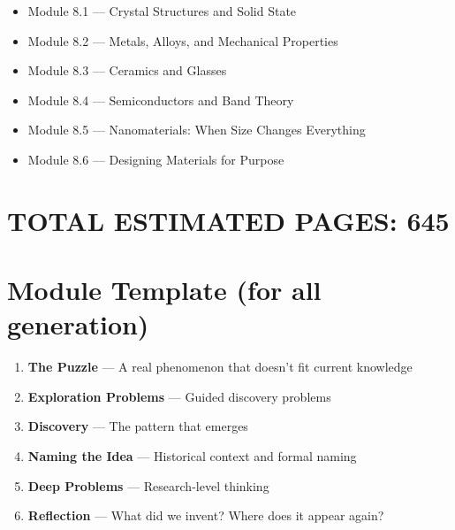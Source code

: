 \documentclass{article}
\begin{document}
\begin{itemize}
    \item Module 8.1 — Crystal Structures and Solid State
    \item Module 8.2 — Metals, Alloys, and Mechanical Properties
    \item Module 8.3 — Ceramics and Glasses
    \item Module 8.4 — Semiconductors and Band Theory
    \item Module 8.5 — Nanomaterials: When Size Changes Everything
    \item Module 8.6 — Designing Materials for Purpose
\end{itemize}

\section*{TOTAL ESTIMATED PAGES: 645}

\section*{Module Template (for all generation)}
\begin{enumerate}[label=\arabic*.]
    \item \textbf{The Puzzle} — A real phenomenon that doesn't fit current knowledge
    \item \textbf{Exploration Problems} — Guided discovery problems
    \item \textbf{Discovery} — The pattern that emerges
    \item \textbf{Naming the Idea} — Historical context and formal naming
    \item \textbf{Deep Problems} — Research-level thinking
    \item \textbf{Reflection} — What did we invent? Where does it appear again?
\end{enumerate}
\end{document}
